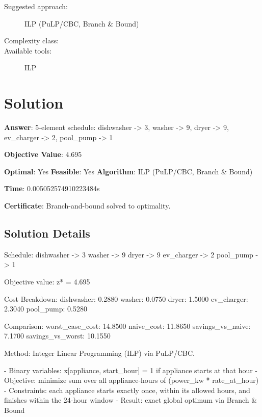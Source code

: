 \documentclass[11pt, a4paper]{article}
\begin{document}
\begin{description}
  \item[Suggested approach:] ILP (PuLP/CBC, Branch \& Bound)
  \item[Complexity class:] 
  \item[Available tools:] ILP
\end{description}
\section{Solution}

\begin{polyaresult}

\textbf{Answer}: 5-element schedule: dishwasher -> 3, washer -> 9, dryer -> 9, ev\_charger -> 2, pool\_pump -> 1

\textbf{Objective Value}: $4.695$

\textbf{Optimal}: Yes \hfill
\textbf{Feasible}: Yes
\textbf{Algorithm}: ILP (PuLP/CBC, Branch \& Bound) \quad $$

\textbf{Time}: 0.005052574910223484s

\textbf{Certificate}: Branch-and-bound solved to optimality.

\end{polyaresult}

\subsection{Solution Details}

Schedule:
  dishwasher -> 3
  washer -> 9
  dryer -> 9
  ev\_charger -> 2
  pool\_pump -> 1

Objective value: z* = 4.695

Cost Breakdown:
  dishwasher: 0.2880
  washer: 0.0750
  dryer: 1.5000
  ev\_charger: 2.3040
  pool\_pump: 0.5280

Comparison:
  worst\_case\_cost: 14.8500
  naive\_cost: 11.8650
  savings\_vs\_naive: 7.1700
  savings\_vs\_worst: 10.1550

Method: Integer Linear Programming (ILP) via PuLP/CBC.

- Binary variables: x[appliance, start\_hour] = 1 if appliance starts at that hour
- Objective: minimize sum over all appliance-hours of (power\_kw * rate\_at\_hour)
- Constraints: each appliance starts exactly once, within its allowed hours, and finishes within the 24-hour window
- Result: exact global optimum via Branch \& Bound
\end{document}
